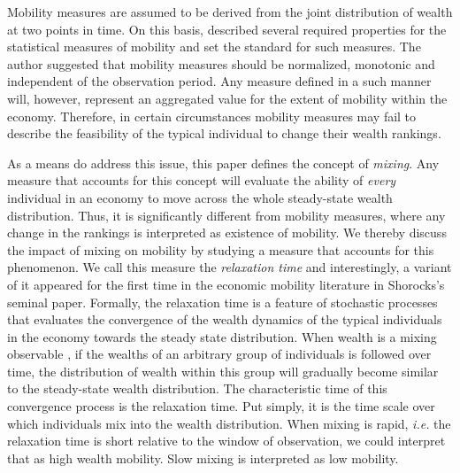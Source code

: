 \documentclass[11pt]{article}
\newcommand{\blue}[1]{{\color{blue} #1}}
\newcommand{\ie}{{\it i.e.}\xspace}
\newcommand{\YB}[1]{\blue{{\it YB: #1 YB}}}
\numberwithin{equation}{section}
\begin{document}
Mobility measures are assumed to be derived from the joint distribution of wealth at two points in time. On this basis, \citet{Shorrocks1978} described several required properties for the statistical measures of mobility and set the standard for such measures. The author suggested that mobility measures should be normalized, monotonic and independent of the observation period. Any measure defined in a such manner will, however, represent an aggregated value for the extent of mobility within the economy. Therefore, in certain circumstances mobility measures may fail to describe the feasibility of the typical individual to change their wealth rankings.


As a means do address this issue, this paper defines the concept of \textit{mixing}. Any measure that accounts for this concept will evaluate the ability of \textit{every} individual in an economy to move across the whole steady-state wealth distribution. Thus, it is significantly different from mobility measures, where any change in the rankings is interpreted as existence of mobility. We thereby discuss the impact of mixing on mobility by studying a measure that accounts for this phenomenon. We call this measure the \textit{relaxation time} and interestingly, a variant of it appeared for the first time in the economic mobility literature in Shorocks's seminal paper. Formally, the relaxation time is a feature of stochastic processes that evaluates the convergence of the wealth dynamics of the typical individuals in the economy towards the steady state distribution. When wealth is a mixing observable \citep{PetersAdamou2018c}, if the wealths of an arbitrary group of individuals is followed over time, the distribution of wealth within this group will gradually become similar to the steady-state wealth distribution. The characteristic time of this convergence process is the relaxation time. Put simply, it is the time scale over which individuals mix into the wealth distribution. When mixing is rapid, \ie the relaxation time is short relative to the window of observation, we could interpret that as high wealth mobility. Slow mixing is interpreted as low mobility.
\end{document}
